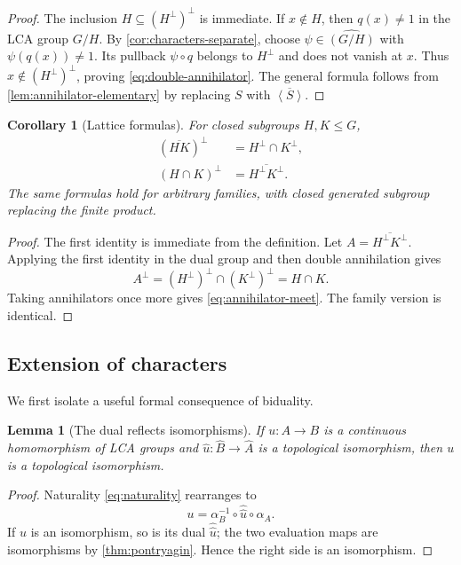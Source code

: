 \documentclass[11pt]{article}
\newtheorem{lemma}[theorem]{Lemma}
\newtheorem{corollary}[theorem]{Corollary}
\theoremstyle{definition}
\theoremstyle{remark}
\newcommand{\dual}[1]{\widehat{#1}}
\newcommand{\bidual}[1]{\widehat{\widehat{#1}}}
\newcommand{\angles}[1]{\left\langle #1\right\rangle}
\begin{document}
\begin{proof}
The inclusion $H\subseteq(H^\perp)^\perp$ is immediate.  If $x\notin H$, then
$q(x)\neq1$ in the LCA group $G/H$.  By
\cref{cor:characters-separate}, choose $\psi\in\dual{(G/H)}$ with
$\psi(q(x))\neq1$.  Its pullback $\psi\circ q$ belongs to $H^\perp$ and does not vanish
at $x$.  Thus $x\notin(H^\perp)^\perp$, proving \eqref{eq:double-annihilator}.  The
general formula follows from \cref{lem:annihilator-elementary} by replacing $S$ with
$\overline{\angles S}$.
\end{proof}

\begin{corollary}[Lattice formulas]
\label{cor:annihilator-lattice}
For closed subgroups $H,K\leq G$,
\begin{align}
 (\overline{HK})^\perp&=H^\perp\cap K^\perp,
 \label{eq:annihilator-join}\\
 (H\cap K)^\perp&=\overline{H^\perp K^\perp}.
 \label{eq:annihilator-meet}
\end{align}
The same formulas hold for arbitrary families, with closed generated subgroup replacing
the finite product.
\end{corollary}

\begin{proof}
The first identity is immediate from the definition.  Let
$A=\overline{H^\perp K^\perp}$.  Applying the first identity in the dual group and then
double annihilation gives
\[
 A^\perp=(H^\perp)^\perp\cap(K^\perp)^\perp=H\cap K.
\]
Taking annihilators once more gives \eqref{eq:annihilator-meet}.  The family version is
identical.
\end{proof}

\subsection{Extension of characters}

We first isolate a useful formal consequence of biduality.

\begin{lemma}[The dual reflects isomorphisms]
\label{lem:dual-reflects-iso}
If $u:A\to B$ is a continuous homomorphism of LCA groups and
$\dual u:\dual B\to\dual A$ is a topological isomorphism, then $u$ is a topological
isomorphism.
\end{lemma}

\begin{proof}
Naturality \eqref{eq:naturality} rearranges to
\begin{equation}
  u=\alpha_B^{-1}\circ\bidual u\circ\alpha_A.
  \label{eq:dual-reflects-iso}
\end{equation}
If $\dual u$ is an isomorphism, so is its dual $\bidual u$; the two evaluation maps are
isomorphisms by \cref{thm:pontryagin}.  Hence the right side is an isomorphism.
\end{proof}
\end{document}
